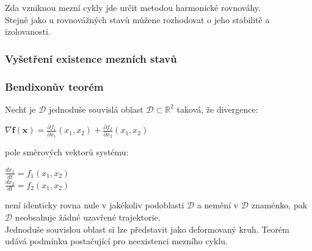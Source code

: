 Zda vzniknou mezní cykly jde určit metodou harmonické rovnováhy.\\
Stejně jako u rovnovážných stavů můžene rozhodovat o jeho stabilitě a izolovanosti.\\
\subsubsection{Vyšetření existence mezních stavů}
\subsubsection*{Bendixonův teorém}
Nechť je \(\mathcal{D}\) jednoduše souvislá oblast \(\mathcal{D} \subset \mathbb{R}^2 \) taková, že divergence:
\begin{center}
    \(\nabla \mathbf{f}(\mathbf{x}) = \frac{\partial f_1}{\partial x_1}(x_1,x_2) + \frac{\partial f_2}{\partial x_2}(x_1,x_2)\)
\end{center}
pole směrových vektorů systému:
\begin{center}
    \(\frac{dx_1}{dt} = f_1(x_1,x_2)\)\\
    \(\frac{dx_2}{dt} = f_2(x_1,x_2)\)
\end{center}
není identicky rovna nule v jakékoliv podoblasti \(\mathcal{D}\) a nemění v \(\mathcal{D}\) znaménko, pak \(\mathcal{D}\) neobsahuje žádné uzavřené trajektorie.\\
Jednoduše souvislou oblast si lze představit jako deformovaný kruh. Teorém udává podmínku postačující pro neexistenci mezního cyklu.\\
